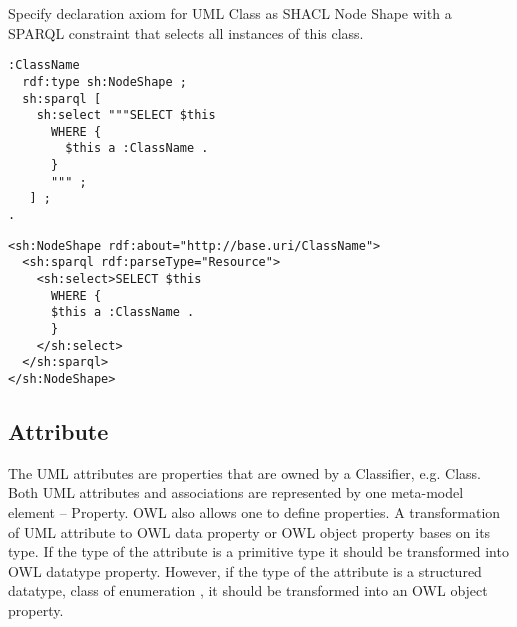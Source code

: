 \begin{trule}
	\label{rule:class-abstract-ds}
	Specify declaration axiom for UML Class as SHACL Node Shape with a SPARQL constraint that selects all instances of this class.
\end{trule}

\vspace{-\parskip}
\begin{minipage}[b]{.47\textwidth}
\begin{lstlisting}[language=Turtle, caption={Instance checking constraint in Turtle syntax}, captionpos=b]
:ClassName
  rdf:type sh:NodeShape ;
  sh:sparql [
    sh:select """SELECT $this
      WHERE {
        $this a :ClassName .
      }
      """ ;
   ] ;
.
\end{lstlisting}
\end{minipage}%
\quad
\begin{minipage}[b]{.5\textwidth}
\begin{lstlisting}[language=RDF/XML, caption={Instance checking constraint in RDF/XML syntax}, captionpos=b]
<sh:NodeShape rdf:about="http://base.uri/ClassName">
  <sh:sparql rdf:parseType="Resource">  
    <sh:select>SELECT $this
      WHERE {
      $this a :ClassName .
      }
    </sh:select>
  </sh:sparql>
</sh:NodeShape>
\end{lstlisting}
\end{minipage}

\subsection{Attribute}
\label{sec:attribute}

The UML attributes \citep{uml2.5} are properties that are owned by a Classifier, e.g. Class. Both UML attributes and associations are represented by one meta-model element -- Property. OWL also allows one to define properties. A transformation of UML attribute to OWL data property or OWL object property bases on its type. If the type of the attribute is a primitive type it should be transformed into OWL datatype property. However, if the type of the attribute is a structured datatype, class of enumeration , it should be transformed into an OWL object property.

